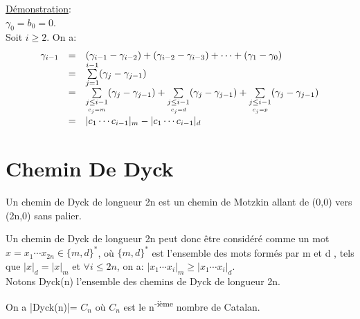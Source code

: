 		\underline{Démonstration}:\\
			$\gamma_{0}=b_{0}=0$.\\
			Soit $i\geq2$. On a:\\
			$$
			\begin{array}{c c l}
				\gamma_{i-1}&=&(\gamma_{i-1}-\gamma_{i-2})+(\gamma_{i-2}-\gamma_{i-3})+\cdots+(\gamma_{1}-\gamma_{0})\\

				&=&\underset{j=1}{\overset{i-1}{\sum}}(\gamma_{j}-\gamma_{j-1})\\

				&=&\underset{\underset{c_{j}=m}{j\leq i-1}}{\sum}(\gamma_{j}-\gamma_{j-1})+\underset{\underset{c_{j}=d}{j\leq i-1}}{\sum}(\gamma_{j}-\gamma_{j-1})+\underset{\underset{c_{j}=p}{j\leq i-1}}{\sum}(\gamma_{j}-\gamma_{j-1})\\

				&=&|c_{1}\cdots c_{i-1}|_m-|c_{1}\cdots c_{i-1}|_d

			\end{array}
			$$

	\section{Chemin De Dyck}

		\begin{definition}
			\begin{rm}
				Un chemin de Dyck de longueur 2n est un chemin de Motzkin allant de (0,0) vers (2n,0) sans palier.
			\end{rm}
		\end{definition}

		Un chemin de Dyck de longueur 2n peut donc être considéré comme un mot\\ $x=x_{1}\cdots x_{2n}\in \{m,d\}^* $, où  $\{m,d\}^*$ est l'ensemble des mots formés par m et d , tels que $|x|_{d}=|x|_{m}$ et $\forall i\leq 2n$, on a: $|x_{1}\cdots x_{i}|_{m}\geq |x_{1}\cdots x_{i}|_{d}$.\\
		Notons Dyck(n) l'ensemble des chemins de Dyck de longueur 2n.
		\begin{proposition}
			\begin{rm}
				On a |Dyck(n)|= $C_{n}$ où $C_{n}$ est le n\textsuperscript{-ième }nombre de Catalan.
			\end{rm}
		\end{proposition}

